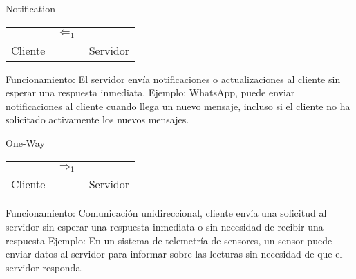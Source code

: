 \vspace{3mm}

\begin{center}
    \begin{minipage}[t]{0.45\textwidth}
        \begin{center}
            Notification        
    
            \begin{tabular}{c c c}
                        & $\Leftarrow_{1}$ &  \\                 
                Cliente &               & Servidor                    
            \end{tabular}
        \end{center}

        Funcionamiento: El servidor envía notificaciones o actualizaciones al cliente sin esperar una respuesta inmediata. 
        Ejemplo: WhatsApp, puede enviar notificaciones al cliente cuando llega un nuevo mensaje, incluso si el cliente no ha solicitado activamente los nuevos mensajes.
    \end{minipage}
    \hspace{15mm}
    \begin{minipage}[t]{0.45\textwidth}
        \begin{center}
            One-Way
            
            \begin{tabular}{c c c}
                        & $\Rightarrow_{1}$ &  \\ 
                Cliente &               & Servidor \\            
            \end{tabular}
        \end{center}

        Funcionamiento: Comunicación unidireccional, cliente envía una solicitud al servidor sin esperar una respuesta inmediata o sin necesidad de recibir una respuesta
        Ejemplo: En un sistema de telemetría de sensores, un sensor puede enviar datos al servidor para informar sobre las lecturas sin necesidad de que el servidor responda.
    \end{minipage}
\end{center}
    
